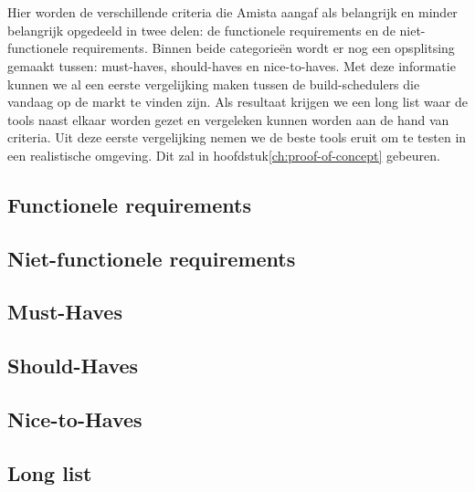 
\chapter{}
\label{ch:vergelijking-build-schedulers}
Hier worden de verschillende criteria die Amista aangaf als belangrijk en minder belangrijk opgedeeld in twee delen: de functionele requirements en de niet-functionele requirements. Binnen beide categorieën wordt er nog een opsplitsing gemaakt tussen: must-haves, should-haves en nice-to-haves.
Met deze informatie kunnen we al een eerste vergelijking maken tussen de build-schedulers die vandaag op de markt te vinden zijn. Als resultaat krijgen we een long list waar de tools naast elkaar worden gezet en vergeleken kunnen worden aan de hand van criteria. 
Uit deze eerste vergelijking nemen we de beste tools eruit om te testen in een realistische omgeving. Dit zal in hoofdstuk\ref{ch:proof-of-concept} gebeuren.

\section{Functionele requirements}
\label{sec:functionele-requirements}

\section{Niet-functionele requirements}
\label{sec:niet-functionele-requirements}

\section{Must-Haves}
\label{sec:must-haves}

\section{Should-Haves}
\label{sec:should-haves}

\section{Nice-to-Haves}
\label{sec:nice-to-haves}

\section{Long list}
\label{sec:Long-list}




